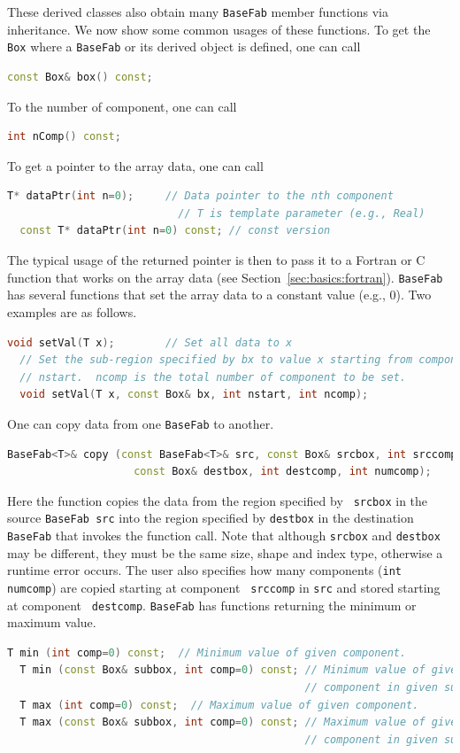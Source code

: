 {These derived classes also obtain many {\tt BaseFab} member functions
via inheritance.  We now show some common usages of these functions.
To get the {\tt Box} where a {\tt BaseFab} or its derived object is
defined, one can call
\begin{lstlisting}[language=cpp]
  const Box& box() const;
\end{lstlisting}
To the number of component, one can call
\begin{lstlisting}[language=cpp]
  int nComp() const;
\end{lstlisting}
To get a pointer to the array data, one can call
\begin{lstlisting}[language=cpp]
  T* dataPtr(int n=0);     // Data pointer to the nth component
                           // T is template parameter (e.g., Real)
  const T* dataPtr(int n=0) const; // const version
\end{lstlisting}
The typical usage of the returned pointer is then to pass it to a
Fortran or C function that works on the array data (see
Section~\ref{sec:basics:fortran}).
{\tt BaseFab} has several functions that set the array data to a
constant value (e.g., 0).  Two examples are as follows.  
\begin{lstlisting}[language=cpp]
  void setVal(T x);        // Set all data to x
  // Set the sub-region specified by bx to value x starting from component
  // nstart.  ncomp is the total number of component to be set.
  void setVal(T x, const Box& bx, int nstart, int ncomp);
\end{lstlisting}
One can copy data from one {\tt BaseFab} to another.
\begin{lstlisting}[language=cpp]
  BaseFab<T>& copy (const BaseFab<T>& src, const Box& srcbox, int srccomp,
                    const Box& destbox, int destcomp, int numcomp);
\end{lstlisting}
Here the function copies the data from the region specified by {\tt
  srcbox} in the source {\tt BaseFab src} into the region specified by
{\tt destbox} in the destination {\tt BaseFab} that invokes the
function call.  Note that although {\tt srcbox} and {\tt destbox} may
be different, they must be the same size, shape and index type,
otherwise a runtime error occurs.  The user also specifies how many
components ({\tt int numcomp}) are copied starting at component {\tt
  srccomp} in {\tt src} and stored starting at component {\tt
  destcomp}.  {\tt BaseFab} has functions returning the minimum or
maximum value.
\begin{lstlisting}[language=cpp] 
  T min (int comp=0) const;  // Minimum value of given component.
  T min (const Box& subbox, int comp=0) const; // Minimum value of given 
                                               // component in given subbox.
  T max (int comp=0) const;  // Maximum value of given component.
  T max (const Box& subbox, int comp=0) const; // Maximum value of given 
                                               // component in given subbox.
\end{lstlisting}

}
